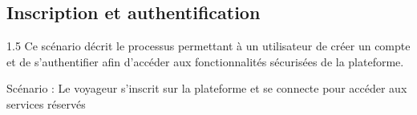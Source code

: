 \documentclass[a4paper,12pt]{report}
\newcommand{\actbar}[3]{\draw[hw] (#1-0.28,#2) rectangle (#1+0.28,#3);}
\newcommand{\seqA}[4]{\draw[seqmsg] (#1,#3) -- node[above,seqlbl]{#4} (#2,#3);}
\newcommand{\seqR}[4]{\draw[seqret] (#1,#3) -- node[above,seqlbl]{#4} (#2,#3);}
\newcommand{\seqF}[6]{%
  \draw[seqfrag] (#1,#2) rectangle (#3,#4);
  \node[font=\tiny\sffamily\bfseries,text=mainblue] at (#1+0.9,#2-0.18){#5};
  \node[font=\tiny\sffamily,text=mainblue!75,align=center]
        at ({(#1+#3)/2},#2-0.38){#6};}
\newcommand{\CPA}{0}
\newcommand{\CPB}{5.5}
\newcommand{\CPC}{12}
\newcommand{\CPD}{18.5}
\begin{document}
\subsection{Inscription et authentification}
\vspace{0.5cm}
\begin{spacing}{1.5}
\justifying
Ce scénario décrit le processus permettant à un utilisateur de créer un compte et de s'authentifier afin d'accéder aux fonctionnalités sécurisées de la plateforme.

Scénario : Le voyageur s'inscrit sur la plateforme et se connecte pour accéder aux 
services réservés 
    
    
    
    
    
    
    
    

\end{spacing}
\end{document}
